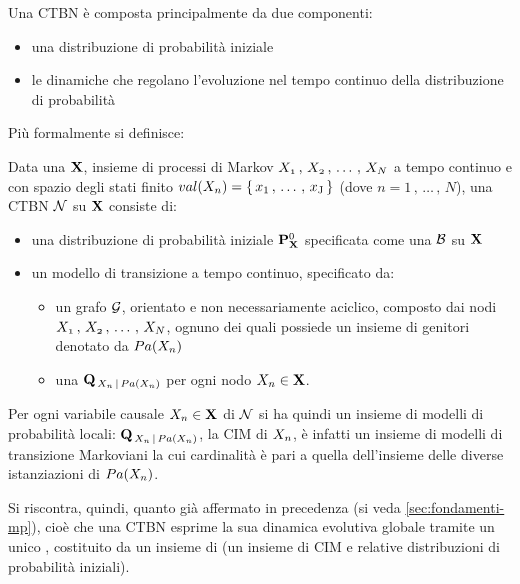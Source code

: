 Una \acs{CTBN} è composta principalmente da due componenti:
\begin{itemize}
    \item una distribuzione di probabilità iniziale
    \item le dinamiche che regolano l'evoluzione nel tempo continuo della distribuzione di probabilità
\end{itemize}
Più formalmente si definisce:
\begin{definizione}
\label{defn:ctbn}
Data una \pv{} $\mathbf{X}$, insieme di processi di Markov $\mathnormal{X_1}\,,\,\mathnormal{X_2}\,,\,\dotsc\,,\,\mathnormal{X_N}$ a tempo continuo e con spazio degli stati finito $val(\mathnormal{X_n})=\{\,\mathrm{\mathnormal{x}_1}\,,\,\dotsc\,,\,\mathrm{\mathnormal{x}_J}\,\}$ (dove $n=1\,,\,\dotsc\,,\,N$), una \acs{CTBN} $\mathcal{N}$ su $\mathbf{X}$ consiste di:
\begin{itemize}
    \item una distribuzione di probabilità iniziale $\mathbf{P}^0_{\mathbf{X}}$ specificata come una \bn{} $\mathcal{B}$ su $\mathbf{X}$
    \item un modello di transizione a tempo continuo, specificato da:
    \begin{itemize}
        \item un grafo $\mathcal{G}$, orientato e non necessariamente aciclico, composto dai nodi $\mathnormal{X_1}\,,\,\mathnormal{X_2}\,,\,\dotsc\,,\,\mathnormal{X_N}$, ognuno dei quali possiede un insieme di genitori denotato da $Pa(\mathnormal{X_n})$
        \item una \im*{} \cond*{} $\mathbf{Q}_{\,\mathnormal{X_n}\,\arrowvert\,Pa(\mathnormal{X_n})}$ per ogni nodo $\mathnormal{X_n} \in \mathbf{X}$.
    \end{itemize}
\end{itemize}
\end{definizione}

Per ogni variabile causale $\mathnormal{X_n} \in \mathbf{X}$ di $\mathcal{N}$ si ha quindi un insieme di modelli di probabilità locali: $\mathbf{Q}_{\,\mathnormal{X_n}\,\arrowvert\,Pa(\mathnormal{X_n})}$, la \acs{CIM} di $\mathnormal{X_n}$, è infatti un insieme di modelli di transizione Markoviani la cui cardinalità è pari a quella dell'insieme delle diverse istanziazioni di $Pa(\mathnormal{X_n})$.

Si riscontra, quindi, quanto già affermato in precedenza (si veda \ref{sec:fondamenti-mp}), cioè che una \acs{CTBN} esprime la sua dinamica evolutiva globale tramite un unico \mprocess*{} \omog*{}, costituito da un insieme di \mprocess{} \cond{} (un insieme di \acs{CIM} e relative distribuzioni di probabilità iniziali).

